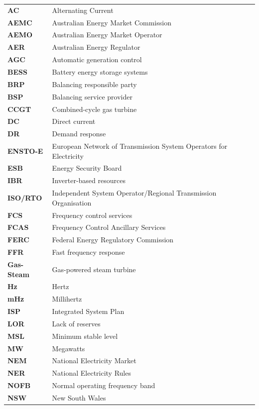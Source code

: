 \documentclass[12pt,a4paper,]{report}
\begin{document}
\begin{longtable}[l]{l l}
\textbf{AC} & Alternating Current \\
\textbf{AEMC} & Australian Energy Market Commission \\ 
\textbf{AEMO} & Australian Energy Market Operator \\
\textbf{AER} & Australian Energy Regulator \\
\textbf{AGC} & Automatic generation control \\
\textbf{BESS} & Battery energy storage systems \\
\textbf{BRP} & Balancing responsible party \\
\textbf{BSP} & Balancing service provider \\
\textbf{CCGT} & Combined-cycle gas turbine \\
\textbf{DC} & Direct current \\
\textbf{DR} & Demand response \\
\textbf{ENSTO-E} & European Network of Transmission System Operators for Electricity \\
\textbf{ESB} & Energy Security Board \\
\textbf{IBR} & Inverter-based resources \\
\textbf{ISO/RTO} &  Independent System Operator/Regional Transmission Organisation \\
\textbf{FCS} & Frequency control services \\
\textbf{FCAS} & Frequency Control Ancillary Services \\
\textbf{FERC} & Federal Energy Regulatory Commission \\
\textbf{FFR} & Fast frequency response \\
\textbf{Gas-Steam} & Gas-powered steam turbine \\
\textbf{Hz} & Hertz \\
\textbf{mHz} & Millihertz \\
\textbf{ISP} & Integrated System Plan \\
\textbf{LOR} & Lack of reserves \\
\textbf{MSL} & Minimum stable level \\
\textbf{MW} & Megawatts \\
\textbf{NEM} & National Electricity Market \\
\textbf{NER} & National Electricity Rules \\
\textbf{NOFB} & Normal operating frequency band \\
\textbf{NSW} & New South Wales \\

\end{longtable}
\end{document}
